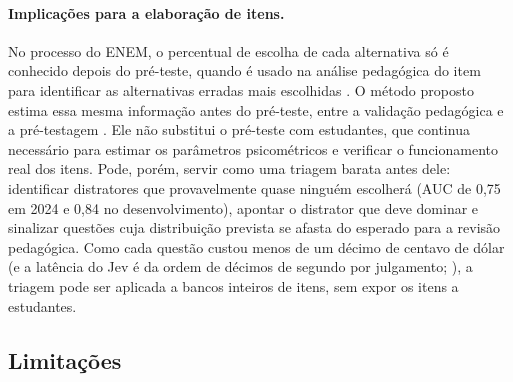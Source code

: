 \paragraph{Implicações para a elaboração de itens.} No processo do ENEM, o percentual de escolha de cada alternativa só é conhecido depois do pré-teste, quando é usado na análise pedagógica do item para identificar as alternativas erradas mais escolhidas \citep{inep2021procedimentos}. O método proposto estima essa mesma informação antes do pré-teste, entre a validação pedagógica e a pré-testagem \citep{inep2021guia}. Ele não substitui o pré-teste com estudantes, que continua necessário para estimar os parâmetros psicométricos e verificar o funcionamento real dos itens. Pode, porém, servir como uma triagem barata antes dele: identificar distratores que provavelmente quase ninguém escolherá (AUC de 0,75 em 2024 e 0,84 no desenvolvimento), apontar o distrator que deve dominar e sinalizar questões cuja distribuição prevista se afasta do esperado para a revisão pedagógica. Como cada questão custou menos de um décimo de centavo de dólar (e a latência do Jev é da ordem de décimos de segundo por julgamento; \citealp{li2026}), a triagem pode ser aplicada a bancos inteiros de itens, sem expor os itens a estudantes.

\subsection{Limitações}\label{sec:limitacoes}

